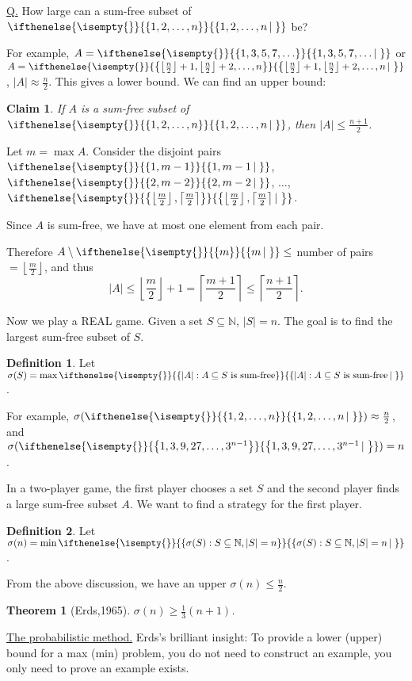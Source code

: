 \documentclass[a4paper,11pt]{amsbook}
\makeatletter
\renewenvironment{proof}[1][\proofname]{\par
    \pushQED{\qed}%
    \normalfont \topsep6\p@\@plus6\p@\relax
    \trivlist
    \itemindent\z@ %
    \item[\hskip\labelsep
          \scshape
      #1\@addpunct{.}]\ignorespaces
}{%
    \popQED\endtrivlist\@endpefalse
}
\newtheorem{theorem}{\hspace{-2em} \color{darkblue} Theorem}[chapter]
\newtheorem{claim}{\hspace{-2em} \color{darkblue} Claim}[chapter]
\theoremstyle{definition}
\newtheorem{definition}{\hspace{-2em} \color{darkblue} Definition}[chapter]
\theoremstyle{remark}
\newcommand{\N}{\mathbb{N}}
\newcommand{\floor}[1]{\left\lfloor#1\right\rfloor}
\newcommand{\ceil}[1]{\left\lceil#1\right\rceil}
\newcommand\inc\subseteq
\newcommand\exc\setminus
\newcommand\0{\varnothing}
\newcommand\set[2][]
{
    \ifthenelse{\isempty{#1}}
    {
        \left\{#2\right\}
    }
    {
        \left\{#2\left|\,#1\right.\right\}
    }
}
\makeatother
\begin{document}
\noindent \underline{Q.} How large can a sum-free subset of $\set{1,2,\ldots,n}$ be?

For example, $A=\set{1,3,5,7,\ldots}$ or $A=\set{\floor{\frac{n}{2}}+1,\floor{\frac{n}{2}}+2,\ldots,n}$, 
$|A|\approx\frac{n}{2}$. This gives a lower bound. We can find an upper bound:

\begin{claim}
    If $A$ is a sum-free subset of $\set{1,2,\ldots,n}$, then $|A|\leq\frac{n+1}{2}$.
\end{claim}
\begin{proof}
    Let $m=\max A$. Consider the disjoint pairs $\set{1,m-1}$, $\set{2,m-2}$, $\ldots$, $\set{\floor{\frac{m}{2}},\ceil{\frac{m}{2}}}$.

    Since $A$ is sum-free, we have at most one element from each pair.

    Therefore $A\exc\set{m}\leq$ number of pairs $=\floor{\frac{m}{2}}$,
    and thus $$|A|\leq\floor{\frac{m}{2}}+1=\ceil{\frac{m+1}{2}}\leq\ceil{\frac{n+1}{2}}.$$
\end{proof}

Now we play a REAL game. Given a set $S\inc\N$, $|S|=n$. The goal is to find the largest sum-free subset of $S$.

\begin{definition}
    Let $\sigma(S)=\max\set{|A|:A\inc S\text{ is sum-free}}$.
\end{definition}

For example, $\sigma(\set{1,2,\ldots,n})\approx\frac{n}{2}$, and $\sigma(\set{1,3,9,27,\ldots,3^{n-1}})=n$.

In a two-player game, the first player chooses a set $S$ and the second player finds a large sum-free subset $A$.
We want to find a strategy for the first player.

\begin{definition}
    Let $\sigma(n)=\min\set{\sigma(S):S\inc\N,|S|=n}$.
\end{definition}

From the above discussion, we have an upper $\sigma(n)\leq\frac{n}{2}$.

\begin{theorem}[Erds,1965]
    $\sigma(n)\geq\frac{1}{3}(n+1)$.
\end{theorem}

\noindent \underline{The probabilistic method.} Erds's brilliant insight:
To provide a lower (upper) bound for a max (min) problem,
you do not need to construct an example, you only need to prove an example exists. 
\end{document}
